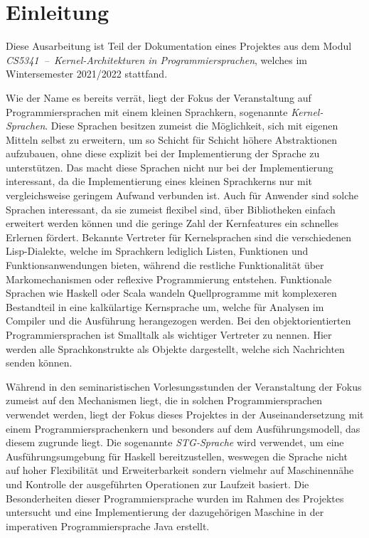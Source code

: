 
\chapter{Einleitung}

Diese Ausarbeitung ist Teil der Dokumentation eines Projektes aus dem Modul \textit{CS5341~--~Kernel-Architekturen in Programmiersprachen}, welches im Wintersemester 2021/2022 stattfand.

Wie der Name es bereits verrät, liegt der Fokus der Veranstaltung auf Programmiersprachen mit einem kleinen Sprachkern, sogenannte \textit{Kernel-Sprachen}.
Diese Sprachen besitzen zumeist die Möglichkeit, sich mit eigenen Mitteln selbst zu erweitern, um so Schicht für Schicht höhere Abstraktionen aufzubauen, ohne diese explizit bei der Implementierung der Sprache zu unterstützen.
Das macht diese Sprachen nicht nur bei der Implementierung interessant, da die Implementierung eines kleinen Sprachkerns nur mit vergleichsweise geringem Aufwand verbunden ist.
Auch für Anwender sind solche Sprachen interessant, da sie zumeist flexibel sind, über Bibliotheken einfach erweitert werden können und die geringe Zahl der Kernfeatures ein schnelles Erlernen fördert.
Bekannte Vertreter für Kernelsprachen sind die verschiedenen Lisp-Dialekte, welche im Sprachkern lediglich Listen, Funktionen und Funktionsanwendungen bieten, während die restliche Funktionalität über Markomechanismen oder reflexive Programmierung entstehen.
Funktionale Sprachen wie Haskell oder Scala wandeln Quellprogramme mit komplexeren Bestandteil in eine kalkülartige Kernsprache um, welche für Analysen im Compiler und die Ausführung herangezogen werden.
Bei den objektorientierten Programmiersprachen ist Smalltalk als wichtiger Vertreter zu nennen.
Hier werden alle Sprachkonstrukte als Objekte dargestellt, welche sich Nachrichten senden können.

Während in den seminaristischen Vorlesungsstunden der Veranstaltung der Fokus zumeist auf den Mechanismen liegt, die in solchen Programmiersprachen verwendet werden, liegt der Fokus dieses Projektes in der Auseinandersetzung mit einem Programmiersprachenkern und besonders auf dem Ausführungsmodell, das diesem zugrunde liegt.
Die sogenannte \textit{STG-Sprache} wird verwendet, um eine Ausführungsumgebung für Haskell bereitzustellen, weswegen die Sprache nicht auf hoher Flexibilität und Erweiterbarkeit sondern vielmehr auf Maschinennähe und Kontrolle der ausgeführten Operationen zur Laufzeit basiert.
Die Besonderheiten dieser Programmiersprache wurden im Rahmen des Projektes untersucht und eine Implementierung der dazugehörigen Maschine in der imperativen Programmiersprache Java erstellt.

